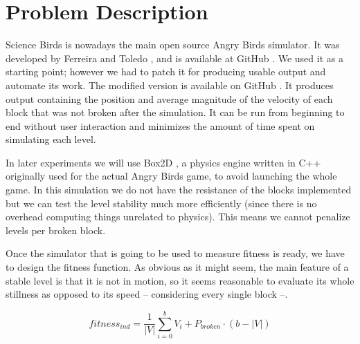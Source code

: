 \documentclass[sigconf]{acmart}
\begin{document}
\section{Problem Description}
\label{sec:angry}

Science Birds is nowadays the main open source Angry Birds
simulator. It was developed by  Ferreira and Toledo
\cite{ferreira2014search}, and is available at 
GitHub \cite{sciencebirds}. We used it  as a starting point; however we
had to patch it for producing usable output 
and automate its work. The modified 
version is available on GitHub \cite{sciencebirds-adapt}. It produces output 
containing the position and average magnitude of the velocity of each block 
that was not broken after the simulation. It can be run from beginning to end 
without user interaction and minimizes the amount of time spent on simulating 
each level. 

In later experiments we will use Box2D \cite{box2d}, a physics engine written 
in C++ originally
used for the actual Angry Birds game, to avoid launching the whole game. In 
this 
simulation we do not have the resistance of the blocks implemented but we can 
test
the level stability much more efficiently (since there is no overhead computing 
things
unrelated to physics). This means we cannot penalize levels per broken block.


Once the simulator that is going to be used to measure fitness is
ready, we have to design the fitness function. As obvious as it
might seem, the main feature of a stable level is that it 
is not in motion, so it seems reasonable to evaluate its whole stillness as 
opposed to its speed -- considering every single block --.

$$fitness_{ind} = \frac{1}{|V|}\sum_{i=0}^{b}{V_i} + P_{broken}\cdot(b-|V|)$$
\end{document}
